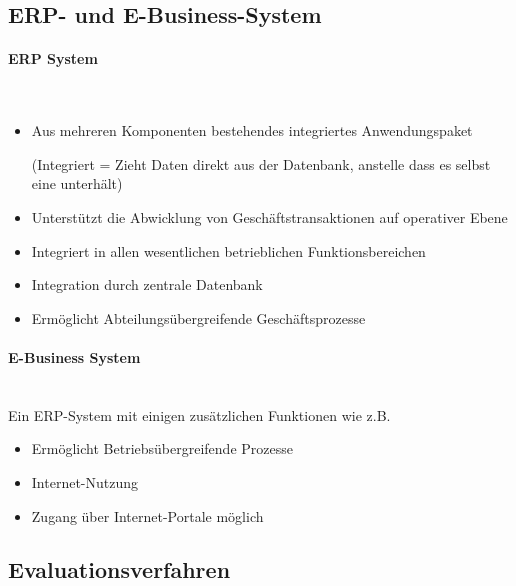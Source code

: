 \documentclass[a4paper, 11pt]{article}
\begin{document}
\subsection{ERP- und E-Business-System}
\paragraph{ERP System}\mbox{}\\
\begin{itemize}
	\item Aus mehreren Komponenten bestehendes integriertes Anwendungspaket
	
	(Integriert = Zieht Daten direkt aus der Datenbank, anstelle dass es selbst eine unterhält)
	\item Unterstützt die Abwicklung von Geschäftstransaktionen auf operativer Ebene
	\item Integriert in allen wesentlichen betrieblichen Funktionsbereichen
	\item Integration durch zentrale Datenbank
	\item Ermöglicht Abteilungsübergreifende Geschäftsprozesse
\end{itemize}

\paragraph{E-Business System}\mbox{}\\
Ein ERP-System mit einigen zusätzlichen Funktionen wie z.B.
\begin{itemize}
	\item Ermöglicht Betriebsübergreifende Prozesse
	\item Internet-Nutzung
	\item Zugang über Internet-Portale möglich
\end{itemize}

\subsection{Evaluationsverfahren}
\end{document}
